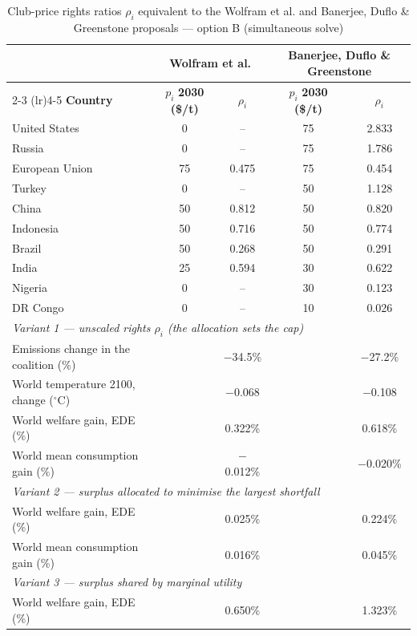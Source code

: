 \begin{table}[htbp]
\centering
\small
\caption{Club-price rights ratios $\rho_i$ equivalent to the Wolfram et al. and Banerjee, Duflo \& Greenstone proposals --- option B (simultaneous solve)}
\renewcommand{\arraystretch}{1.15}
\begin{tabular}{lcccc}
  \toprule
  & \multicolumn{2}{c}{\textbf{Wolfram et al.}} & \multicolumn{2}{c}{\textbf{Banerjee, Duflo \& Greenstone}} \\
  \cmidrule(lr){2-3} \cmidrule(lr){4-5}
  \textbf{Country} & $p_i$ \textbf{2030 (\$/t)} & $\rho_i$ & $p_i$ \textbf{2030 (\$/t)} & $\rho_i$ \\
  \midrule
  United States & 0 & -- & 75 & 2.833 \\
  Russia & 0 & -- & 75 & 1.786 \\
  European Union & 75 & 0.475 & 75 & 0.454 \\
  Turkey & 0 & -- & 50 & 1.128 \\
  China & 50 & 0.812 & 50 & 0.820 \\
  Indonesia & 50 & 0.716 & 50 & 0.774 \\
  Brazil & 50 & 0.268 & 50 & 0.291 \\
  India & 25 & 0.594 & 30 & 0.622 \\
  Nigeria & 0 & -- & 30 & 0.123 \\
  DR Congo & 0 & -- & 10 & 0.026 \\
  \midrule
  \multicolumn{5}{l}{\textit{Variant 1 --- unscaled rights $\rho_i$ (the allocation sets the cap)}} \\
  \quad Emissions change in the coalition (\%) &  & $-$34.5\% &  & $-$27.2\% \\
  \quad World temperature 2100, change ($^\circ$C) &  & $-$0.068 &  & $-$0.108 \\
  \quad World welfare gain, EDE (\%) &  & 0.322\% &  & 0.618\% \\
  \quad World mean consumption gain (\%) &  & $-$0.012\% &  & $-$0.020\% \\
  \midrule
  \multicolumn{5}{l}{\textit{Variant 2 --- surplus allocated to minimise the largest shortfall}} \\
  \quad World welfare gain, EDE (\%) &  & 0.025\% &  & 0.224\% \\
  \quad World mean consumption gain (\%) &  & 0.016\% &  & 0.045\% \\
  \midrule
  \multicolumn{5}{l}{\textit{Variant 3 --- surplus shared by marginal utility}} \\
  \quad World welfare gain, EDE (\%) &  & 0.650\% &  & 1.323\% \\

\end{tabular}
\end{table}
